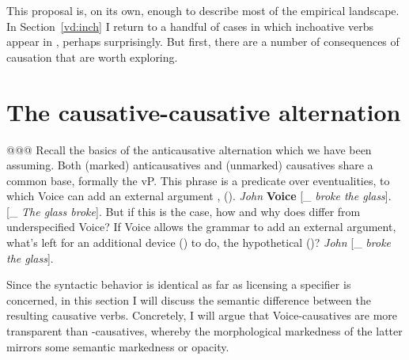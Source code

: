 This proposal is, on its own, enough to describe most of the empirical landscape. In Section~\ref{vd:inch} I return to a handful of cases in which inchoative verbs appear in {\thif}, perhaps surprisingly. But first, there are a number of consequences of causation that are worth exploring.

		


\section{The causative-causative alternation} \label{vd:caus}
@@@
Recall the basics of the anticausative alternation which we have been assuming. Both (marked) anticausatives and (unmarked) causatives share a common base, formally the vP. This phrase is a predicate over eventualities, to which Voice can add an external argument \citep{schaefer08,layering15}, (\nextx).
\pex 
	\a \emph{John} \textbf{Voice} [_{} \emph{broke the glass}].
	\a \textbf{\vz} [_{} \emph{The glass broke}].
\xe
But if this is the case, how and why does {\vd} differ from underspecified Voice? If Voice allows the grammar to add an external argument, what's left for an additional device (\vd) to do, the hypothetical (\nextx)?
\ex \emph{John} \textbf{\vd} [_{} \emph{broke the glass}].
\xe

Since the syntactic behavior is identical as far as licensing a specifier is concerned, in this section I will discuss the semantic difference between the resulting causative verbs. Concretely, I will argue that Voice-causatives are more transparent than {\vd}-causatives, whereby the morphological markedness of the latter mirrors some semantic markedness or opacity.

